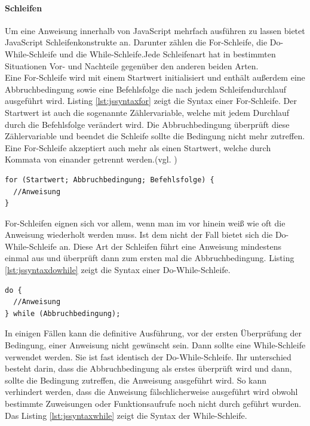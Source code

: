 \documentclass[12pt,a4paper,bibliography=totocnumbered,listof=totocnumbered]{scrartcl}
\begin{document}
\paragraph{Schleifen} Um eine Anweisung innerhalb von JavaScript mehrfach ausführen zu lassen bietet JavaScript Schleifenkonstrukte an. Darunter zählen die For-Schleife, die Do-While-Schleife und die While-Schleife.Jede Schleifenart hat in bestimmten Situationen Vor- und Nachteile gegenüber den anderen beiden Arten.\\Eine For-Schleife wird mit einem Startwert initialisiert und enthält außerdem eine Abbruchbedingung sowie eine Befehlsfolge die nach jedem Schleifendurchlauf ausgeführt wird. Listing \ref{lst:jssyntaxfor} zeigt die Syntax einer For-Schleife. Der Startwert ist auch die sogenannte Zählervariable, welche mit jedem Durchlauf durch die Befehlsfolge verändert wird. Die Abbruchbedingung überprüft diese Zählervariable und beendet die Schleife sollte die Bedingung nicht mehr zutreffen. Eine For-Schleife akzeptiert auch mehr als einen Startwert, welche durch Kommata von einander getrennt werden.(vgl. \cite[S.75f]{WenzJava2008})

	\vspace{1em}
	\begin{lstlisting}[caption=Syntax For-Schleife, label=lst:jssyntaxfor]
for (Startwert; Abbruchbedingung; Befehlsfolge) {
  //Anweisung
}
	\end{lstlisting}
	
For-Schleifen eignen sich vor allem, wenn man im vor hinein weiß wie oft die Anweisung wiederholt werden muss. Ist dem nicht der Fall bietet sich die Do-While-Schleife an. Diese Art der Schleifen führt eine Anweisung mindestens einmal aus und überprüft dann zum ersten mal die Abbruchbedingung. Listing \ref{lst:jssyntaxdowhile} zeigt die Syntax einer Do-While-Schleife.

	\vspace{1em}
	\begin{lstlisting}[caption=Syntax Do-While-Schleife, label=lst:jssyntaxdowhile]
do {
  //Anweisung
} while (Abbruchbedingung);
	\end{lstlisting}

In einigen Fällen kann die definitive Ausführung, vor der ersten Überprüfung der Bedingung, einer Anweisung nicht gewünscht sein. Dann sollte eine While-Schleife verwendet werden. Sie ist fast identisch der Do-While-Schleife. Ihr unterschied besteht darin, dass die Abbruchbedingung als erstes überprüft wird und dann, sollte die Bedingung zutreffen, die Anweisung ausgeführt wird. So kann verhindert werden, dass die Anweisung fälschlicherweise ausgeführt wird obwohl bestimmte Zuweisungen oder Funktionsaufrufe noch nicht durch geführt wurden. Das Listing \ref{lst:jssyntaxwhile} zeigt die Syntax der While-Schleife.
\end{document}
